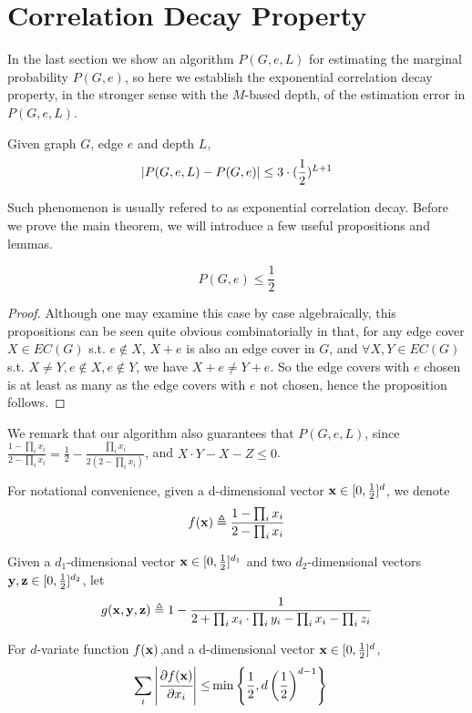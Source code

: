 \section{Correlation Decay Property}

In the last section we show an algorithm $P(G,e,L)$ for estimating the marginal probability $P(G,e)$,
so here we establish the exponential correlation decay property, in the stronger sense with the 
$M$-based depth,
of the estimation error in $P(G,e,L)$.%

\begin{Thm}
	\label{cd-main-theorem}
	Given graph $G$, edge $e$ and depth $L$,
	\[\left\vert P(G,e,L) - P(G,e)\right\vert \leq 3\cdot(\frac{1}{2})^{L+1}\]
\end{Thm}

Such phenomenon is usually refered to as exponential correlation decay. Before we prove the main theorem, we will introduce a few useful propositions and lemmas.

\begin{Prop}
	\[P(G, e) \leq \frac{1}{2}\]
\end{Prop}

\begin{proof}
	Although one may examine this case by case algebraically, this propositions can be seen quite obvious combinatorially in that, for any edge cover $X \in EC(G)$ s.t. $e \notin X$, $X+e$ is also an edge cover in $G$, and $\forall X,Y \in EC(G)$ s.t. $X \neq Y, e \notin X, e\notin Y$, we have $X+e \neq Y+e$. So the edge covers with $e$ chosen is at least as many as the edge covers with $e$ not chosen, hence the proposition follows.
\end{proof}

We remark that our algorithm also guarantees that $P(G,e,L)$, since $\frac{1 - \prod_i x_i}{2 - \prod_i x_i} = \frac{1}{2} - \frac{\prod_i x_i}{2(2 - \prod_i x_i)}$, and $X\cdot Y - X - Z \leq 0$.

For notational convenience, given a d-dimensional vector ${\bf x} \in [0, \frac{1}{2}]^d$, we denote
\[ f({\bf x}) \triangleq \frac{1- \prod_i x_i}{2 - \prod_i x_i}\]

Given a $d_1$-dimensional vector ${\bf x} \in [0, \frac{1}{2}]^{d_1}$ and two $d_2$-dimensional vectors ${\bf y,z} \in [0, \frac{1}{2}]^{d_2}$, let
\[ g({\bf x,y,z}) \triangleq  1- \frac{1}{2+\prod_i x_i \cdot \prod_i y_i - \prod_i x_i - \prod_i z_i} \]


	\begin{Lem}
		For $d$-variate function $f({\bf x})$,and a d-dimensional vector ${\bf x} \in [0, \frac{1}{2}]^d$,
		\begin{align*}
			\sum_i \left\vert\cfrac{\partial f({\bf x})}{\partial x_i}\right\vert \leq & \min{\left\{\frac{1}{2}, d \left( \frac{1}{2} \right)^{d-1}\right\}}
		\end{align*}
	\end{Lem}

